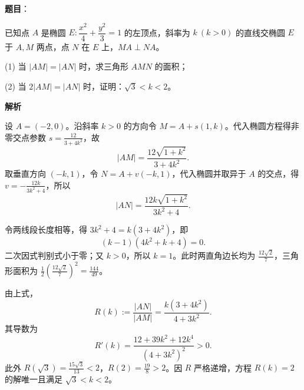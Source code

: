 \begin{answer}

\textbf{题目}：

已知点 $A$ 是椭圆 $E:\dfrac{x^2}{4}+\dfrac{y^2}{3}=1$ 的左顶点，斜率为 $k\ (k>0)$ 的直线交椭圆 $E$ 于 $A,M$ 两点，点 $N$ 在 $E$ 上，$MA\perp NA$。

   (1) 当 $|AM|=|AN|$ 时，求三角形 $AMN$ 的面积；

   (2) 当 $2|AM|=|AN|$ 时，证明：$\sqrt3<k<2$。

\textbf{解析}

设 $A=(-2,0)$。沿斜率 $k>0$ 的方向令 $M=A+s(1,k)$。代入椭圆方程得非零交点参数
$s=\frac{12}{3+4k^2}$，故
\nopagebreak[4]
\[
|AM|=\frac{12\sqrt{1+k^2}}{3+4k^2}.
\]
取垂直方向 $(-k,1)$，令 $N=A+v(-k,1)$，代入椭圆并取异于 $A$ 的交点，得 $v=-\frac{12k}{3k^2+4}$，所以
\nopagebreak[4]
\[
|AN|=\frac{12k\sqrt{1+k^2}}{3k^2+4}.
\]


令两线段长度相等，得 $3k^2+4=k(3+4k^2)$，即
\nopagebreak[4]
\[
(k-1)(4k^2+k+4)=0.
\]
二次因式判别式小于零；又 $k>0$，所以 $k=1$。此时两直角边长均为 $\frac{12\sqrt2}{7}$，三角形面积为
$\frac12(\frac{12\sqrt2}{7})^2=\frac{144}{49}$。


由上式，
\nopagebreak[4]
\[
R(k):=\frac{|AN|}{|AM|}=\frac{k(3+4k^2)}{4+3k^2}.
\]
其导数为
\nopagebreak[4]
\[
R'(k)=\frac{12+39k^2+12k^4}{(4+3k^2)^2}>0.
\]
此外 $R(\sqrt3)=\frac{15\sqrt3}{13}<2$，$R(2)=\frac{19}{8}>2$。因 $R$ 严格递增，方程 $R(k)=2$ 的解唯一且满足 $\sqrt3<k<2$。



\end{answer}
